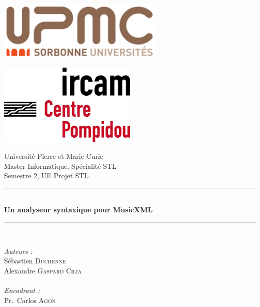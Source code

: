 \documentclass[a4paper,12pt]{article}
\begin{document}

\begin{titlepage}
\begin{center}

\begin{minipage}[c]{.46\linewidth}
  \centering
  \includegraphics[width=0.6\textwidth]{logo_UPMC.png}\\[1cm]
\end{minipage}
\hfill
\begin{minipage}[c]{.46\linewidth}
  \centering
  \includegraphics[width=0.5\textwidth]{logo_ircam.png}\\[1cm]
\end{minipage}

\vspace*{1cm}

{\large Université Pierre et Marie Curie}\\[1cm]

{\large Master Informatique, Spécialité STL}\\[1cm]

{\large Semestre 2, UE Projet STL}\\[1cm]

\rule{\linewidth}{0.5mm} \\[0.5cm]
{ \huge \bfseries Un analyseur syntaxique pour MusicXML \\[0.4cm] }
\rule{\linewidth}{0.5mm} \\[0.5cm]

\vspace*{1cm}

\noindent
\begin{minipage}{0.5\textwidth}
  \begin{flushleft} \large
    \emph{Auteurs :}\\
      Sébastien \textsc{Duchenne}\\
      Alexandre \textsc{Gaspard Cilia}\\~\\
    \emph{Encadrant :} \\
    Pr.~Carlos \textsc{Agon}\\
  \end{flushleft}
\end{minipage}


\end{center}
\end{titlepage}
\end{document}
